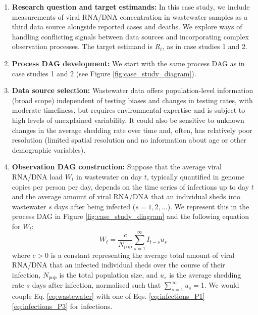\documentclass{article}
\begin{document}
\begin{enumerate}
   \item \textbf{Research question and target estimands:} In this case study, we include measurements of viral \ac{RNA}/\ac{DNA} concentration in wastewater samples as a third data source alongside reported cases and deaths. We explore ways of handling conflicting signals between data sources and incorporating complex observation processes. The target estimand is $R_t$, as in case studies 1 and 2.
   
    \item \textbf{Process DAG development:} We start with the same process \ac{DAG} as in case studies 1 and 2 (see Figure \ref{fig:case_study_diagram}).

    \item \textbf{Data source selection:} Wastewater data offers population-level information (broad scope) independent of testing biases and changes in testing rates, with moderate timeliness, but requires environmental expertise and is subject to high levels of unexplained variability. It could also be sensitive to unknown changes in the average shedding rate over time and, often, has relatively poor resolution (limited spatial resolution and no information about age or other demographic variables). 

    
    \item \textbf{Observation DAG construction:} 
    Suppose that the average viral \ac{RNA}/\ac{DNA} load $W_t$ in wastewater on day $t$, typically quantified in genome copies per person per day, depends on the time series of infections up to day $t$ and the average amount of viral \ac{RNA}/\ac{DNA} that an individual sheds into wastewater $s$ days after being infected ($s=1,2,\ldots$). We represent this in the process \ac{DAG} in Figure \ref{fig:case_study_diagram} and the following equation for $W_t$:
    \begin{equation} \label{eq:wastewater}
        W_t = \frac{c}{N_\mathrm{pop}}\sum_{s=1}^\infty I_{t-s}u_s 
    \end{equation}
    where $c>0$ is a constant representing the average total amount of viral \ac{RNA}/\ac{DNA} that an infected individual sheds over the course of their infection, $N_\mathrm{pop}$ is the total population size, and $u_s$ is the average shedding rate $s$ days after infection, normalised such that $\sum_{s=1}^\infty u_s=1$. We would couple Eq. \eqref{eq:wastewater} with one of Eqs. \eqref{eq:infections_P1}--\eqref{eq:infections_P3} for infections.
    

\end{enumerate}
\end{document}
